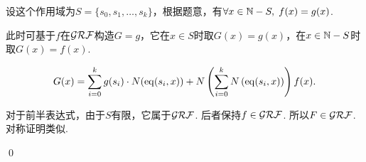 \begin{pf} \rm 

设这个作用域为$S=\{s_0, s_1,\dots, s_k\}$，根据题意，有$\forall x\in\mathbb{N}- S,\;f(x)=g(x)$. 

此时可基于$f$在$\mathcal{GRF}$构造$G=g$，它在$x\in S$时取$G(x) = g(x)$，在$x\in\mathbb{N}-S$时取$G(x) = f(x)$. 

$$
G(x) = \sum^k_{i=0}g(s_i)\cdot N(\mathrm{eq}(s_i, x)) + N\left(\sum_{i=0}^{k} N \left(\mathrm{eq}(s_i, x)\right)\right)f(x).
$$

对于前半表达式，由于$S$有限，它属于$\mathcal{GRF}$. 后者保持$f\in\mathcal{GRF}$. 所以$F\in\mathcal{GRF}$. 对称证明类似.

\qed
\end{pf}
